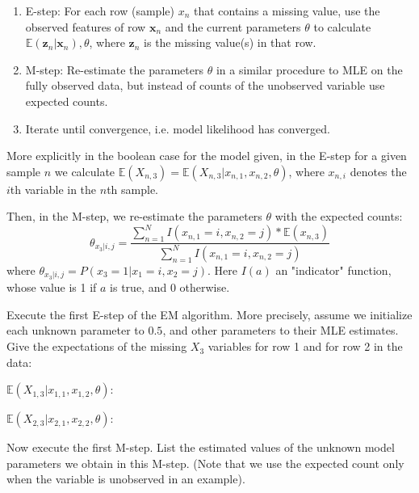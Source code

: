 \documentclass[11pt,addpoints,answers]{exam}
\begin{document}
\begin{questions}
\begin{enumerate}
    \item E-step: For each row (sample) $x_n$ that contains a missing value, use the observed features of row $\mathbf{x}_n$ and the current parameters $\theta$ to calculate $\mathbb{E}(\mathbf{z}_n|\mathbf{x}_n), \theta$, where $\mathbf{z}_n$ is the missing value(s) in that row.
    \item M-step: Re-estimate the parameters $\theta$ in a similar procedure to MLE on the fully observed data, but instead of counts of the unobserved variable use expected counts.
    \item Iterate until convergence, i.e. model likelihood has converged. 
\end{enumerate}

More explicitly in the boolean case for the model given, in the E-step for a given sample $n$ we calculate $\mathbb{E}(X_{n,3}) = \mathbb{E}(X_{n,3}|x_{n,1},x_{n,2},\theta)$, where $x_{n,i}$ denotes the $i$th variable in the $n$th sample.


Then, in the M-step, we re-estimate the parameters $\theta$ with the expected counts: $$\theta_{x_3|i,j} = \frac{\sum_{n=1}^{N} I(x_{n,1} = i, x_{n,2} = j)*\mathbb{E}(x_{n,3})}{\sum_{n=1}^{N} I(x_{n,1} = i, x_{n,2} = j)}$$ where $\theta_{x_3|i,j} = P(x_3 = 1| x_1 = i, x_2 = j)$.  Here $I(a)$ an "indicator" function, whose value is 1 if $a$ is true, and 0 otherwise.

\begin{questions}



\question[2] Execute the first E-step of the EM algorithm. More precisely, assume we initialize each unknown parameter to $0.5$, and other parameters to their MLE estimates. Give the expectations of the missing $X_3$ variables for row 1 and for row 2 in the data:

$\mathbb{E}(X_{1,3}|x_{1,1},x_{1,2},\theta)$: \\
\begin{your_solution}[title=Your Answer:,height=3cm,width=10cm]
\end{your_solution}


$\mathbb{E}(X_{2,3}|x_{2,1},x_{2,2},\theta)$: \\
\begin{your_solution}[title=Your Answer:,height=3cm,width=10cm]
\end{your_solution}

\clearpage

\question[6] Now execute the first M-step. List the estimated values of the unknown model parameters we obtain in this M-step. (Note that we use the expected count only when the variable is
unobserved in an example).


\end{questions}
\end{questions}
\end{document}

